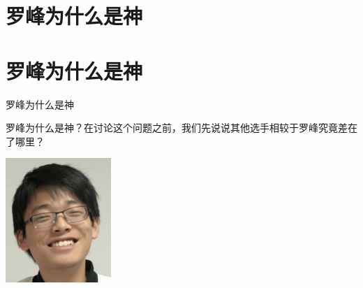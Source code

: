 \def\sectionName{罗峰为什么是神}



\isBeamerMode\relax
    \section[\TOCName]{\sectionName}
\fi
\isBeamerMode\relax
    \section[\TOCName\ -\ \sectionName]{\sectionName}
\fi

\begin{frame}

\isBeamerMode\relax
    {\Huge \sectionName}\par
\fi




罗峰为什么是神？在讨论这个问题之前，我们先说说其他选手相较于罗峰究竟差在了哪里？

\begin{center}
\includegraphics[width=0.3\textwidth]{./pic/luofeng.jpg}
\end{center}

\end{frame}

